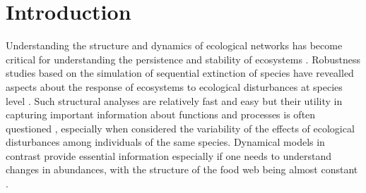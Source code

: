 \section{Introduction}

Understanding the structure and dynamics of ecological networks has become critical for understanding the persistence and stability of ecosystems \cite{dunne2005modeling}. Robustness studies based on the simulation of sequential extinction of species have revealled aspects about the response of ecosystems to ecological disturbances at species level \cite{desantana2013topological}. Such structural analyses are relatively fast and easy but their utility in capturing important information about functions and processes is often questioned \cite{jordan2012simulating}, especially when considered the variability of the effects of ecological disturbances among individuals of the same species. Dynamical models in contrast provide essential information especially if one needs to understand changes in abundances, with the structure of the food web being almost constant \cite{jordan2012simulating}.

